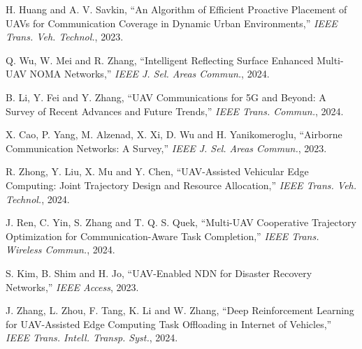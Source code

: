  H. Huang and A. V. Savkin, ``An Algorithm of Efficient Proactive Placement of UAVs for Communication Coverage in Dynamic Urban Environments,'' \emph{IEEE Trans. Veh. Technol.}, 2023.

 Q. Wu, W. Mei and R. Zhang, ``Intelligent Reflecting Surface Enhanced Multi-UAV NOMA Networks,'' \emph{IEEE J. Sel. Areas Commun.}, 2024.

 B. Li, Y. Fei and Y. Zhang, ``UAV Communications for 5G and Beyond: A Survey of Recent Advances and Future Trends,'' \emph{IEEE Trans. Commun.}, 2024.

 X. Cao, P. Yang, M. Alzenad, X. Xi, D. Wu and H. Yanikomeroglu, ``Airborne Communication Networks: A Survey,'' \emph{IEEE J. Sel. Areas Commun.}, 2023.

 R. Zhong, Y. Liu, X. Mu and Y. Chen, ``UAV-Assisted Vehicular Edge Computing: Joint Trajectory Design and Resource Allocation,'' \emph{IEEE Trans. Veh. Technol.}, 2024.

 J. Ren, C. Yin, S. Zhang and T. Q. S. Quek, ``Multi-UAV Cooperative Trajectory Optimization for Communication-Aware Task Completion,'' \emph{IEEE Trans. Wireless Commun.}, 2024.

 S. Kim, B. Shim and H. Jo, ``UAV-Enabled NDN for Disaster Recovery Networks,'' \emph{IEEE Access}, 2023.

 J. Zhang, L. Zhou, F. Tang, K. Li and W. Zhang, ``Deep Reinforcement Learning for UAV-Assisted Edge Computing Task Offloading in Internet of Vehicles,'' \emph{IEEE Trans. Intell. Transp. Syst.}, 2024.